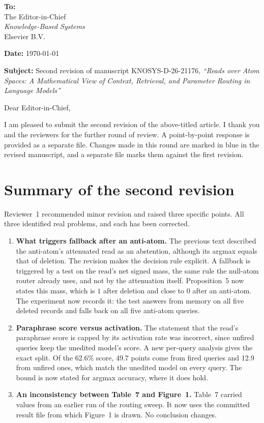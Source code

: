 \documentclass[11pt]{article}
\begin{document}
\textbf{To:}\\
The Editor-in-Chief\\
\emph{Knowledge-Based Systems}\\
Elsevier B.V.

\textbf{Date:} \today

\textbf{Subject:} Second revision of manuscript KNOSYS-D-26-21176, \emph{``Reads over Atom Spaces: A Mathematical View of Context, Retrieval, and Parameter Routing in Language Models''}

\vspace{0.5em}
Dear Editor-in-Chief,

I am pleased to submit the second revision of the above-titled article. I thank you and the reviewers for the further round of review. A point-by-point response is provided as a separate file. Changes made in this round are marked in blue in the revised manuscript, and a separate file marks them against the first revision.

\section*{Summary of the second revision}

Reviewer~1 recommended minor revision and raised three specific points. All three identified real problems, and each has been corrected.
\begin{enumerate}[leftmargin=*]
\item \textbf{What triggers fallback after an anti-atom.} The previous text described the anti-atom's attenuated read as an abstention, although its argmax equals that of deletion. The revision makes the decision rule explicit. A fallback is triggered by a test on the read's net signed mass, the same rule the null-atom router already uses, and not by the attenuation itself. Proposition~5 now states this mass, which is $1$ after deletion and close to $0$ after an anti-atom. The experiment now records it: the test answers from memory on all five deleted records and falls back on all five anti-atom queries.
\item \textbf{Paraphrase score versus activation.} The statement that the read's paraphrase score is capped by its activation rate was incorrect, since unfired queries keep the unedited model's score. A new per-query analysis gives the exact split. Of the 62.6\% score, 49.7 points come from fired queries and 12.9 from unfired ones, which match the unedited model on every query. The bound is now stated for argmax accuracy, where it does hold.
\item \textbf{An inconsistency between Table~7 and Figure~1.} Table~7 carried values from an earlier run of the routing sweep. It now uses the committed result file from which Figure~1 is drawn. No conclusion changes.
\end{enumerate}
\end{document}
